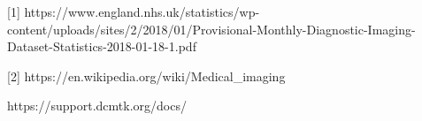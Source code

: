 [1] https://www.england.nhs.uk/statistics/wp-content/uploads/sites/2/2018/01/Provisional-Monthly-Diagnostic-Imaging-Dataset-Statistics-2018-01-18-1.pdf


[2] https://en.wikipedia.org/wiki/Medical_imaging


https://support.dcmtk.org/docs/



